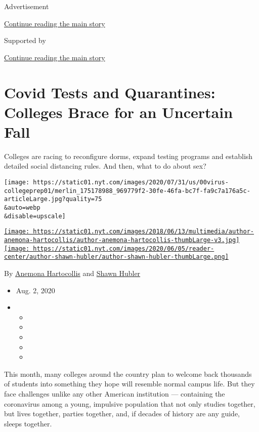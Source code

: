 Advertisement

\protect\hyperlink{after-top}{Continue reading the main story}

Supported by

\protect\hyperlink{after-sponsor}{Continue reading the main story}

\hypertarget{covid-tests-and-quarantines-colleges-brace-for-an-uncertain-fall}{%
\section{Covid Tests and Quarantines: Colleges Brace for an Uncertain
Fall}\label{covid-tests-and-quarantines-colleges-brace-for-an-uncertain-fall}}

Colleges are racing to reconfigure dorms, expand testing programs and
establish detailed social distancing rules. And then, what to do about
sex?

\texttt{[image: https://static01.nyt.com/images/2020/07/31/us/00virus-collegeprep01/merlin\_175178988\_969779f2-30fe-46fa-bc7f-fa9c7a176a5c-articleLarge.jpg?quality=75\\\&auto=webp\\\&disable=upscale]}

\href{https://www.nytimes.com/by/anemona-hartocollis}{\texttt{[image: https://static01.nyt.com/images/2018/06/13/multimedia/author-anemona-hartocollis/author-anemona-hartocollis-thumbLarge-v3.jpg]}}\href{https://www.nytimes.com/by/shawn-hubler}{\texttt{[image: https://static01.nyt.com/images/2020/06/05/reader-center/author-shawn-hubler/author-shawn-hubler-thumbLarge.png]}}

By \href{https://www.nytimes.com/by/anemona-hartocollis}{Anemona
Hartocollis} and \href{https://www.nytimes.com/by/shawn-hubler}{Shawn
Hubler}

\begin{itemize}
\item
  Aug. 2, 2020
\item
  \begin{itemize}
  \item
  \item
  \item
  \item
  \item
  \end{itemize}
\end{itemize}

This month, many colleges around the country plan to welcome back
thousands of students into something they hope will resemble normal
campus life. But they face challenges unlike any other American
institution --- containing the coronavirus among a young, impulsive
population that not only studies together, but lives together, parties
together, and, if decades of history are any guide, sleeps together.

